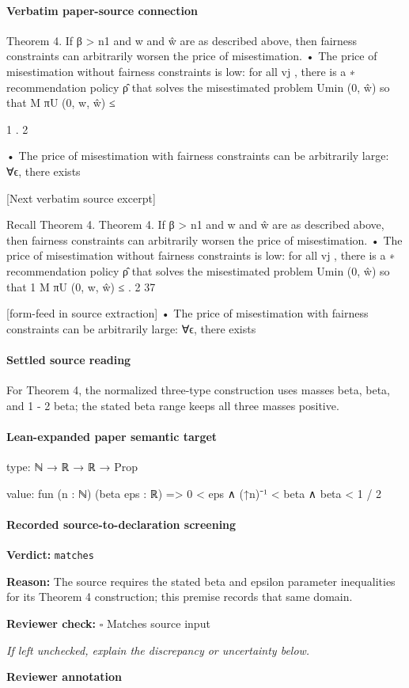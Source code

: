 \documentclass[10pt]{article}
\newcommand{\reviewerbox}{%
  \par\noindent\fbox{\parbox{0.96\linewidth}{\rule{0pt}{0.38in}}}\par
}
\newcommand{\reviewmatch}[1]{%
  \par\noindent\textbf{Reviewer check:} $\square$\; #1\par
  \noindent\emph{If left unchecked, explain the discrepancy or uncertainty below.}\par
}
\begin{document}
\paragraph{Verbatim paper-source connection}
\begin{ReviewVerbatim}
Theorem 4. If β > n1 and w and ŵ are as described above, then fairness constraints can arbitrarily
worsen the price of misestimation.
• The price of misestimation without fairness constraints is low: for all {vj }, there is a
∗
recommendation policy ρ̂ that solves the misestimated problem Umin
(0, ŵ) so that
M
πU
(0, w, ŵ) ≤

1
.
2

• The price of misestimation with fairness constraints can be arbitrarily large: ∀ϵ, there exists

[Next verbatim source excerpt]

Recall Theorem 4.
Theorem 4. If β > n1 and w and ŵ are as described above, then fairness constraints can arbitrarily
worsen the price of misestimation.
• The price of misestimation without fairness constraints is low: for all {vj }, there is a
∗
recommendation policy ρ̂ that solves the misestimated problem Umin
(0, ŵ) so that
1
M
πU
(0, w, ŵ) ≤ .
2
37


[form-feed in source extraction]
• The price of misestimation with fairness constraints can be arbitrarily large: ∀ϵ, there exists
\end{ReviewVerbatim}

\paragraph{Settled source reading}
For Theorem 4, the normalized three-\allowbreak{}type construction uses masses beta, beta, and 1 -\allowbreak{} 2 beta;\allowbreak{} the stated beta range keeps all three masses positive.\allowbreak{}

\paragraph{Lean-expanded paper semantic target}
\begin{ReviewVerbatim}
type:
ℕ → ℝ → ℝ → Prop

value:
fun (n : ℕ) (beta eps : ℝ) => 0 < eps ∧ (↑n)⁻¹ < beta ∧ beta < 1 / 2
\end{ReviewVerbatim}


\paragraph{Recorded source-to-declaration screening}
\textbf{Verdict:} \texttt{matches}
\\
{\raggedright
\textbf{Reason:} The source requires the stated beta and epsilon parameter inequalities for its Theorem 4 construction;\allowbreak{} this premise records that same domain.\allowbreak{}
\par}
\reviewmatch{Matches source input}
\noindent\textbf{Reviewer annotation}\par
\reviewerbox
\clearpage
\hypertarget{paper-prerequisite-c46e8e73b66a828e}{}
\end{document}

